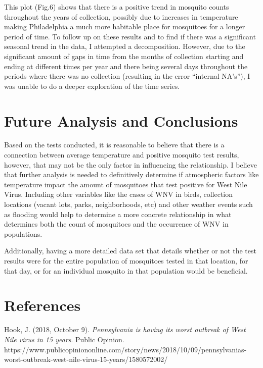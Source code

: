 \documentclass[
  letterpaper,
  DIV=11,
  numbers=noendperiod]{scrartcl}
\begin{document}
This plot (Fig.6) shows that there is a positive trend in mosquito
counts throughout the years of collection, possibly due to increases in
temperature making Philadelphia a much more habitable place for
mosquitoes for a longer period of time. To follow up on these results
and to find if there was a significant seasonal trend in the data, I
attempted a decomposition. However, due to the significant amount of
gaps in time from the months of collection starting and ending at
different times per year and there being several days throughout the
periods where there was no collection (resulting in the error ``internal
NA's''), I was unable to do a deeper exploration of the time series.

\hypertarget{future-analysis-and-conclusions}{%
\section{Future Analysis and
Conclusions}\label{future-analysis-and-conclusions}}

Based on the tests conducted, it is reasonable to believe that there is
a connection between average temperature and positive mosquito test
results, however, that may not be the only factor in influencing the
relationship. I believe that further analysis is needed to definitively
determine if atmospheric factors like temperature impact the amount of
mosquitoes that test positive for West Nile Virus. Including other
variables like the cases of WNV in birds, collection locations (vacant
lots, parks, neighborhoods, etc) and other weather events such as
flooding would help to determine a more concrete relationship in what
determines both the count of mosquitoes and the occurrence of WNV in
populations.

Additionally, having a more detailed data set that details whether or
not the test results were for the entire population of mosquitoes tested
in that location, for that day, or for an individual mosquito in that
population would be beneficial.

\hypertarget{references}{%
\section{References}\label{references}}

Hook, J. (2018, October 9). \emph{Pennsylvania is having its worst
outbreak of West Nile virus in 15 years}. Public Opinion.
https://www.publicopiniononline.com/story/news/2018/10/09/pennsylvanias-worst-outbreak-west-nile-virus-15-years/1580572002/
\end{document}
